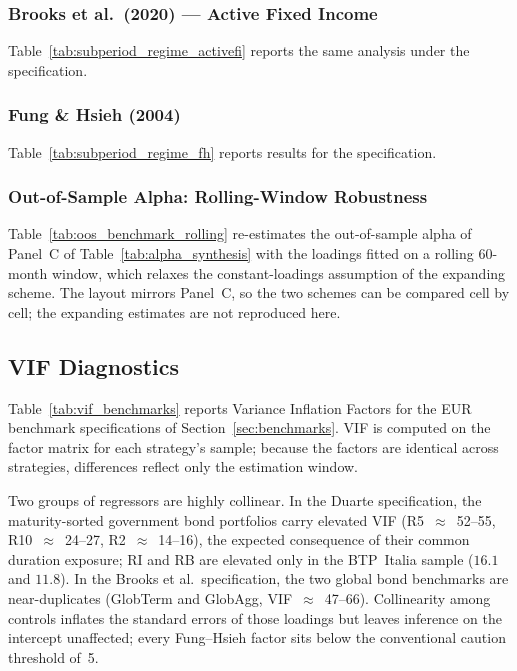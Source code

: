 \subsubsection{Brooks et al.\ (2020) --- Active Fixed Income}
\label{app:subperiod_activefi}
Table~\ref{tab:subperiod_regime_activefi} reports the same analysis under the
\citet{brooks2020active} specification.

 
 
 
\subsubsection{Fung \& Hsieh (2004)}
\label{app:subperiod_fh}
Table~\ref{tab:subperiod_regime_fh} reports results for the
\citet{fung2004hedge} specification.

 

 

\subsubsection{Out-of-Sample Alpha: Rolling-Window Robustness}
\label{app:oos_rolling}
Table~\ref{tab:oos_benchmark_rolling} re-estimates the out-of-sample
alpha of Panel~C of Table~\ref{tab:alpha_synthesis} with the loadings
fitted on a rolling 60-month window, which relaxes the constant-loadings
assumption of the expanding scheme. The layout mirrors Panel~C, so the
two schemes can be compared cell by cell; the expanding estimates are
not reproduced here.



\subsection{VIF Diagnostics}
\label{app:vif}
 
Table~\ref{tab:vif_benchmarks} reports Variance Inflation Factors for
the EUR benchmark specifications of Section~\ref{sec:benchmarks}. VIF is
computed on the factor matrix for each strategy's sample; because the
factors are identical across strategies, differences reflect only the
estimation window.
 
Two groups of regressors are highly collinear. In the Duarte
specification, the maturity-sorted government bond portfolios carry
elevated VIF (R5~$\approx$~52--55, R10~$\approx$~24--27,
R2~$\approx$~14--16), the expected consequence of their common duration
exposure; RI and RB are elevated only in the BTP~Italia sample ($16.1$
and $11.8$). In the Brooks et al.\ specification, the two global bond
benchmarks are near-duplicates (GlobTerm and GlobAgg,
VIF~$\approx$~47--66). Collinearity among controls inflates the
standard errors of those loadings but leaves inference on the
intercept unaffected; every Fung--Hsieh factor sits below the
conventional caution threshold of~5.
 
